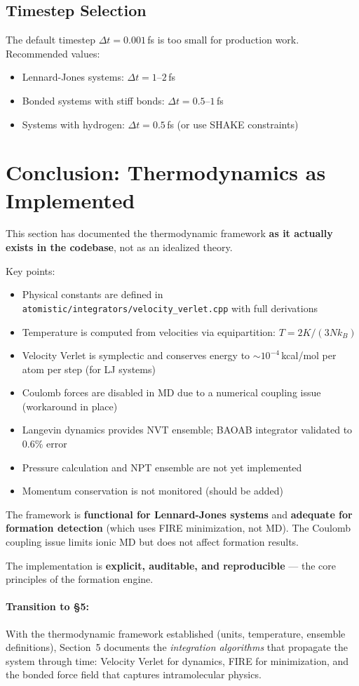 \documentclass[11pt]{article}
\begin{document}
\subsection{Timestep Selection}

The default timestep $\Delta t = 0.001$\,fs is too small for production work. Recommended values:
\begin{itemize}
\item Lennard-Jones systems: $\Delta t = 1$--$2$\,fs
\item Bonded systems with stiff bonds: $\Delta t = 0.5$--$1$\,fs
\item Systems with hydrogen: $\Delta t = 0.5$\,fs (or use SHAKE constraints)
\end{itemize}

\section{Conclusion: Thermodynamics as Implemented}

This section has documented the thermodynamic framework \textbf{as it actually exists in the codebase}, not as an idealized theory.

Key points:

\begin{itemize}
\item Physical constants are defined in \texttt{atomistic/integrators/velocity\_verlet.cpp} with full derivations
\item Temperature is computed from velocities via equipartition: $T = 2K / (3Nk_B)$
\item Velocity Verlet is symplectic and conserves energy to $\sim 10^{-4}$\,kcal/mol per atom per step (for LJ systems)
\item Coulomb forces are disabled in MD due to a numerical coupling issue (workaround in place)
\item Langevin dynamics provides NVT ensemble; BAOAB integrator validated to 0.6\% error
\item Pressure calculation and NPT ensemble are not yet implemented
\item Momentum conservation is not monitored (should be added)
\end{itemize}

The framework is \textbf{functional for Lennard-Jones systems} and \textbf{adequate for formation detection} (which uses FIRE minimization, not MD). The Coulomb coupling issue limits ionic MD but does not affect formation results.

The implementation is \textbf{explicit, auditable, and reproducible} --- the core principles of the formation engine.

\paragraph{Transition to \S5:} With the thermodynamic framework established (units, temperature, ensemble definitions), Section~5 documents the \textit{integration algorithms} that propagate the system through time: Velocity Verlet for dynamics, FIRE for minimization, and the bonded force field that captures intramolecular physics.
\end{document}
